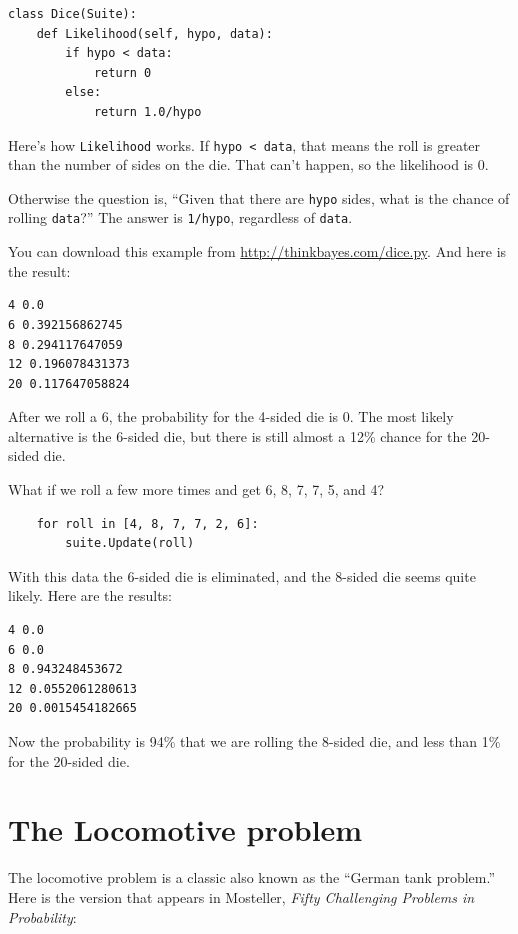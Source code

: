 \documentclass[12pt]{book}
\begin{document}
\begin{verbatim}
class Dice(Suite):
    def Likelihood(self, hypo, data):
        if hypo < data:
            return 0
        else:
            return 1.0/hypo
\end{verbatim}

Here's how \verb"Likelihood" works.  If \verb"hypo < data", that
means the roll is greater than the number of sides on the die.
That can't happen, so the likelihood is 0.

Otherwise the question is, ``Given that there are {\tt hypo}
sides, what is the chance of rolling {\tt data}?''  The
answer is \verb"1/hypo", regardless of {\tt data}.

You can download this example from \url{http://thinkbayes.com/dice.py}.
And here is the result:

\begin{verbatim}
4 0.0
6 0.392156862745
8 0.294117647059
12 0.196078431373
20 0.117647058824
\end{verbatim}

After we roll a 6, the probability for the 4-sided die is 0.  The
most likely alternative is the 6-sided die, but there is still
almost a 12\% chance for the 20-sided die.

What if we roll a few more times and get 6, 8, 7, 7, 5, and 4?

\begin{verbatim}
    for roll in [4, 8, 7, 7, 2, 6]:
        suite.Update(roll)
\end{verbatim}

With this data the 6-sided die is eliminated, and the 8-sided
die seems quite likely.  Here are the results:

\begin{verbatim}
4 0.0
6 0.0
8 0.943248453672
12 0.0552061280613
20 0.0015454182665
\end{verbatim}

Now the probability is 94\% that we are rolling the 8-sided die,
and less than 1\% for the 20-sided die.


\section{The Locomotive problem}

The locomotive problem is a classic also
known as the ``German tank problem.''  Here is the version
that appears in Mosteller, {\it Fifty Challenging Problems in
  Probability}:
\end{document}
